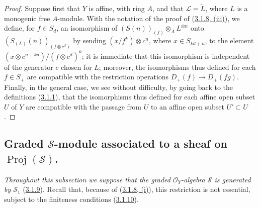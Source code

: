 \begin{proof}
Suppose first that $Y$ is affine, with ring $A$, and that
$\mathcal{L}=\widetilde{L}$, where $L$ is a monogenic free $A$-module. With
the notation of the proof of
(\hyperref[II.3.1.8]{3.1.8, (iii)}), we define, for $f\in S_d$, an
isomorphism of $(S(n))_{(f)}\otimes_A L^{\otimes n}$ onto
$(S_{(L)}(n))_{(f\otimes c^d)}$ by sending
$(x/f^k)\otimes c^n$, where $x\in S_{kd+n}$, to the element
$(x\otimes c^{n+kd})/(f\otimes c^d)^k$; it is immediate
that this isomorphism is independent of the generator $c$ chosen for $L$;
moreover, the isomorphisms thus defined for each $f\in S_+$ are compatible
with the restriction operations $D_+(f)\to D_+(fg)$. Finally, in the
general case, we see without difficulty, by going back to the definitions
(\hyperref[II.3.1.1]{3.1.1}), that the isomorphisms thus defined for
each affine open subset $U$ of $Y$ are compatible with the passage from $U$
to an affine open subset $U'\subset U$.
\end{proof}

\subsection{Graded $\mathcal{S}$-module associated to a sheaf on
$\operatorname{Proj}(\mathcal{S})$.}
\label{subsection:II.3.3}

\emph{Throughout this subsection we suppose that the graded
$\mathcal{O}_Y$-algebra $\mathcal{S}$ is generated by $\mathcal{S}_1$}
(\hyperref[II.3.1.9]{3.1.9}). Recall that, because of
(\hyperref[II.3.1.8]{3.1.8, (i)}), this restriction is not essential,
subject to the finiteness conditions (\hyperref[II.3.1.10]{3.1.10}).

